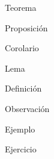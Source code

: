 \documentclass[12pt]{report}
\theoremstyle{largebreak}
\begin{document}
    \newpage


    \begin{theor}[Nombre]
        Teorema
    \end{theor}

    \begin{propo}[Nombre]
        Proposición
    \end{propo}

    \begin{cor}[Nombre]
        Corolario
    \end{cor}

    \begin{lema}[Nombre]
        Lema
    \end{lema}

    \begin{mydef}[Nombre]
        Definición
    \end{mydef}

    \begin{obs}[Nombre]
        Observación
    \end{obs}

    \begin{exa}[Nombre]
        Ejemplo
    \end{exa}

    \begin{excer}[Nombre]
        Ejercicio
    \end{excer}
\end{document}
